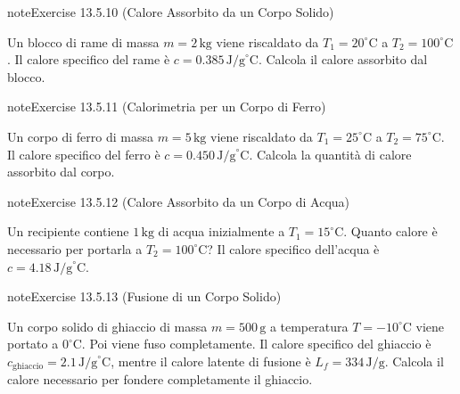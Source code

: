 \documentclass[letterpaper,10pt,italian]{jupyterBook}
\begin{document}
\begin{sphinxadmonition}{note}{Exercise 13.5.10 (Calore Assorbito da un Corpo Solido)}



\sphinxAtStartPar
Un blocco di rame di massa \(m = 2 \, \text{kg}\) viene riscaldato da \(T_1 = 20^\circ \text{C}\) a \(T_2 = 100^\circ \text{C}\). Il calore specifico del rame è \(c = 0.385 \, \text{J/g}^\circ \text{C}\). Calcola il calore assorbito dal blocco.
\end{sphinxadmonition}
 \label{exercise:ch/thermodynamics/foundation-problems-exercise-10}

\begin{sphinxadmonition}{note}{Exercise 13.5.11 (Calorimetria per un Corpo di Ferro)}



\sphinxAtStartPar
Un corpo di ferro di massa \(m = 5 \, \text{kg}\) viene riscaldato da \(T_1 = 25^\circ \text{C}\) a \(T_2 = 75^\circ \text{C}\). Il calore specifico del ferro è \(c = 0.450 \, \text{J/g}^\circ \text{C}\). Calcola la quantità di calore assorbito dal corpo.
\end{sphinxadmonition}
 \label{exercise:ch/thermodynamics/foundation-problems-exercise-11}

\begin{sphinxadmonition}{note}{Exercise 13.5.12 (Calore Assorbito da un Corpo di Acqua)}



\sphinxAtStartPar
Un recipiente contiene \(1 \, \text{kg}\) di acqua inizialmente a \(T_1 = 15^\circ \text{C}\). Quanto calore è necessario per portarla a \(T_2 = 100^\circ \text{C}\)? Il calore specifico dell’acqua è \(c = 4.18 \, \text{J/g}^\circ \text{C}\).
\end{sphinxadmonition}
 \label{exercise:ch/thermodynamics/foundation-problems-exercise-12}

\begin{sphinxadmonition}{note}{Exercise 13.5.13 (Fusione di un Corpo Solido)}



\sphinxAtStartPar
Un corpo solido di ghiaccio di massa \(m = 500 \, \text{g}\) a temperatura \(T = -10^\circ \text{C}\) viene portato a \(0^\circ \text{C}\). Poi viene fuso completamente. Il calore specifico del ghiaccio è \(c_{\text{ghiaccio}} = 2.1 \, \text{J/g}^\circ \text{C}\), mentre il calore latente di fusione è \(L_f = 334 \, \text{J/g}\). Calcola il calore necessario per fondere completamente il ghiaccio.
\end{sphinxadmonition}
 \label{exercise:ch/thermodynamics/foundation-problems-exercise-13}
\end{document}
